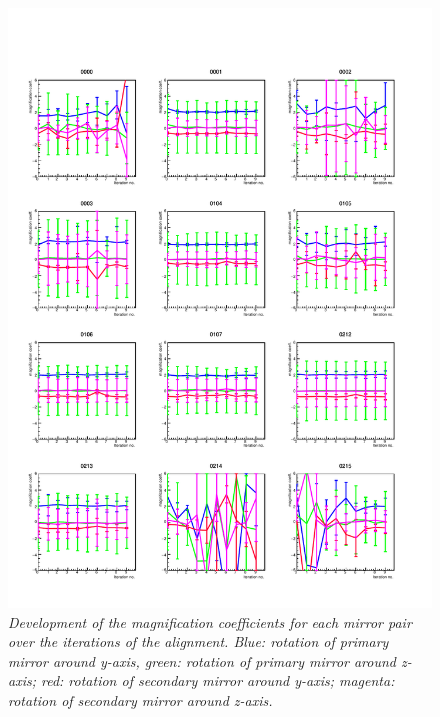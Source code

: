 \begin{figure}[!ht]
	\vspace*{-0.cm}
	\begin{center}
		\includegraphics[width=1.\textwidth]{rich1_mag1_1.pdf}
		\vspace*{-1.5cm}
	\end{center}
	\caption{\textit{Development of the magnification coefficients for each mirror pair over the iterations of the alignment. Blue: rotation of primary mirror around y-axis, green: rotation of primary mirror around z-axis; red: rotation of secondary mirror around y-axis; magenta: rotation of secondary mirror around z-axis.}}
	\label{fig:rich1mag1_1}
\end{figure}

